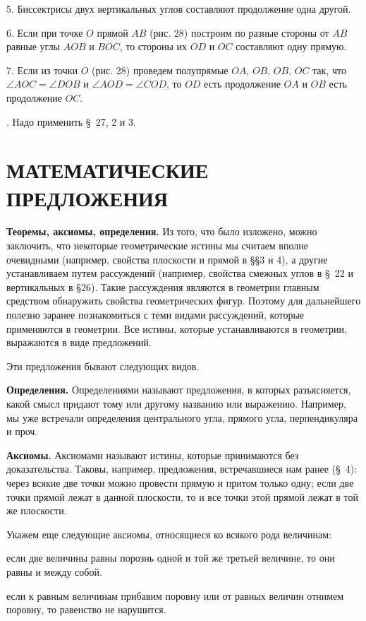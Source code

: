\documentclass[oneside]{book}
\begin{document}
5.
Биссектрисы двух вертикальных углов составляют продолжение одна другой.

6.
Если при точке $O$ прямой $AB$ (рис. 28) построим по разные стороны от $AB$ равные углы $AOB$ и $BOC$, то стороны их $OD$ и $OC$ составляют одну прямую.

7.
Если из точки $O$ (рис. 28) проведем полупрямые $OA$, $OB$, $OB$, $OC$ так, что $\angle AOC = \angle DOB$ и $\angle AOD=\angle COD$, то $OD$ есть продолжение $OA$ и $OB$ есть продолжение $OC$.

.
Надо применить §~27, 2 и 3.

\section{МАТЕМАТИЧЕСКИЕ ПРЕДЛОЖЕНИЯ}



\textbf{Теоремы, аксиомы, определения.}
Из того, что было изложено, можно заключить, что некоторые геометрические истины мы считаем вполне очевидными (например, свойства плоскости и прямой в §§3 и 4), а другие устанавливаем путем рассуждений (например, свойства смежных углов в §~22 и вертикальных в §26).
Такие рассуждения являются в геометрии главным средством обнаружить свойства геометрических фигур.
Поэтому для дальнейшего полезно заранее познакомиться с теми видами рассуждений, которые применяются в геометрии.
Все истины, которые устанавливаются в геометрии, выражаются в виде предложений.

Эти предложения бывают следующих видов.

\textbf{Определения.}
Определениями называют предложения, в которых разъясняется, какой смысл придают тому или другому названию или выражению.
Например, мы уже встречали определения центрального угла, прямого угла, перпендикуляра и проч.

\textbf{Аксиомы.}
Аксиомами называют истины, которые принимаются без доказательства.
Таковы, например, предложения, встречавшиеся нам ранее (§~4):
через всякие две точки можно провести прямую и притом только одну;
если две точки прямой лежат в данной плоскости, то и все точки этой прямой лежат в той же плоскости.

Укажем еще следующие аксиомы, относящиеся ко всякого рода величинам:

если две величины равны порознь одной и той же третьей величине, то они равны и между собой.

если к равным величинам прибавим поровну или от равных величин отнимем поровну, то равенство не нарушится.
\end{document}
